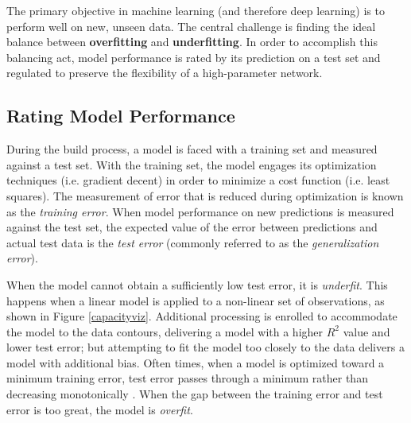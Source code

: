 The primary objective in machine learning (and therefore deep learning) is to perform well on new, unseen data.  The central challenge is finding the ideal balance between \textbf{overfitting} and \textbf{underfitting}.  In order to accomplish this balancing act, model performance is rated by its prediction on a test set and regulated to preserve the flexibility of a high-parameter network.

\subsection{Rating Model Performance}


During the build process, a model is faced with a training set and measured against a test set.  With the training set, the model engages its optimization techniques (i.e. gradient decent) in order to minimize a cost function (i.e. least squares).  The measurement of error that is reduced during optimization is known as the \textit{training error}.  When model performance on new predictions is measured against the test set, the expected value of the error between predictions and actual test data is the \textit{test error} (commonly referred to as the \textit{generalization error}). \cite{Goodfellow-et-al-2016}

 When the model cannot obtain a sufficiently low test error, it is \textit{underfit}.  This happens when a linear model is applied to a non-linear set of observations, as shown in Figure \ref{capacityviz}.  Additional processing is enrolled to accommodate the model to the data contours, delivering a model with a higher $R^2$ value and lower test error; but attempting to fit the model too closely to the data delivers a model with additional bias.  Often times, when a model is optimized toward a minimum training error, test error passes through a minimum rather than decreasing monotonically \cite{mackay1992bayesian}.  When the gap between the training error and test error is too great, the model is \textit{overfit}.
 
